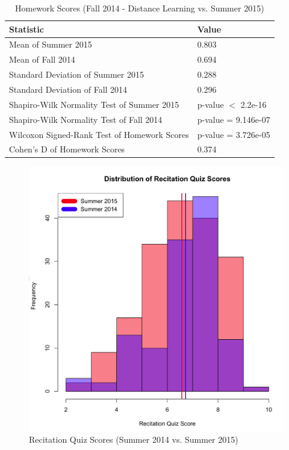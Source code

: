 \pagebreak\clearpage

\begin{small}
\begin{table}
  \centering
  \begin{tabular}{|l|l|}
    \hline
    \textbf{Statistic} & \textbf{Value} \\
	\hline
	Mean of Summer 2015 & 0.803 \\
	\hline
	Mean of Fall 2014 & 0.694 \\
	\hline
	Standard Deviation of Summer 2015 & 0.288 \\
	\hline
	Standard Deviation of Fall 2014 & 0.296 \\
	\hline
	Shapiro-Wilk Normality Test of Summer 2015 & p-value $<$ 2.2e-16 \\
	\hline
	Shapiro-Wilk Normality Test of Fall 2014 & p-value = 9.146e-07 \\
	\hline
	Wilcoxon Signed-Rank Test of Homework Scores & p-value = 3.726e-05 \\
	\hline
	Cohen's D of Homework Scores & 0.374 \\
	\hline
  \end{tabular}
	\caption{Homework Scores (Fall 2014 - Distance Learning vs. Summer 2015)}
  \label{tab:hwf14dSu15}
\end{table}
\end{small}

\pagebreak\clearpage

\begin{figure}
	\centering
	\includegraphics[width=5in]{img/chapter4/rq_su15_vs_su14}
	\caption{Recitation Quiz Scores (Summer 2014 vs. Summer 2015)}
  \label{fig:rqSu14Su15}
\end{figure}


